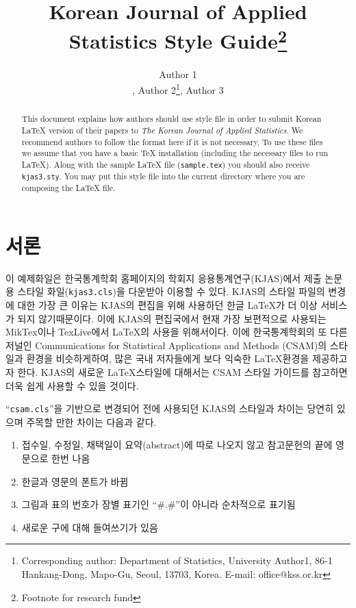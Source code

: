 \documentclass[eng]{kjas3}
\begin{document}
\title{Korean Journal of Applied Statistics Style Guide\footnote{Footnote for research fund}}

\author{
Author 1\address[a]{Department of Statistics, University of Author1;},
Author 2\footnote{Corresponding author:
Department of Statistics, University Author1,
 86-1 Hankang-Dong, Mapo-Gu, Seoul, 13703, Korea.
E-mail: office@kss.or.kr}\same[a],
Author 3\address[b]{Department of Statistics, University of Author3}
}

\begin{abstract}
This document explains how authors should use style file in order
to submit Korean \LaTeX{} version of their papers to
\textit{The Korean Journal of Applied Statistics}.
We recommend authors to follow the format here if it is not necessary.
To use these files we assume that you have a basic \TeX{} installation (including the
necessary files to run \LaTeX{}). Along with the sample \LaTeX{}
file ({\tt sample.tex}) you should also receive {\tt kjas3.sty}.
You may put this style file into the current
directory where you are composing the \LaTeX{} file.
\end{abstract}



\section{서론}
이 예제화일은 한국통계학회 홈페이지의 학회지 응용통계연구(KJAS)에서
제출 논문용 스타일 화일({\tt kjas3.cls})을 다운받아 이용할 수 있다.
KJAS의 스타일 파일의 변경에 대한 가장 큰 이유는 KJAS의 편집을 위해 사용하던 한글 \LaTeX{}가
더 이상 서비스가 되지 않기때문이다.
이에 KJAS의 편집국에서 현재 가장 보편적으로 사용되는 MikTex이나 TexLive에서
\LaTeX{}의 사용을 위해서이다.
이에 한국통계학회의 또 다른 저널인 Communications for Statistical Applications and Methods (CSAM)의 스타일과
환경을 비슷하게하여, 많은 국내 저자들에게 보다 익숙한 \LaTeX{}환경을 제공하고자 한다.
KJAS의 새로운 \LaTeX{}스타일에 대해서는 CSAM 스타일 가이드를 참고하면 더욱 쉽게 사용할 수 있을 것이다.

``{\tt csam.cls}''을 기반으로 변경되어 전에 사용되던 KJAS의 스타일과 차이는 당연히 있으며
주목할 만한 차이는 다음과 같다.
%
\begin{enumerate}
\item 접수일, 수정일, 채택일이 요약(abstract)에 따로 나오지 않고 참고문헌의 끝에 영문으로 한번 나옴

\item 한글과 영문의 폰트가 바뀜

\item 그림과 표의 번호가 장별 표기인 ``\#.\#''이 아니라 순차적으로 표기됨

\item 새로운 구에 대해 들여쓰기가 있음
\end{enumerate}
%
\end{document}
